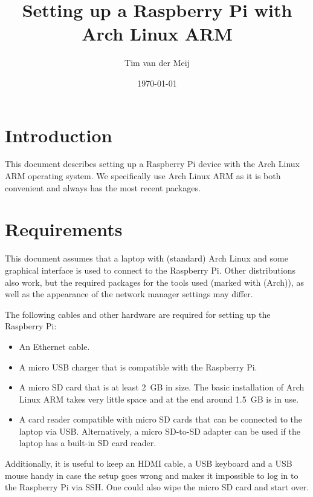 \documentclass{article}
\newcommand{\arch}{{\color{red} (Arch)}}
\begin{document}
\title{Setting up a Raspberry Pi with Arch Linux ARM}
\author{Tim van der Meij}
\date{\today}

\maketitle

\section{Introduction}
This document describes setting up a Raspberry Pi device with the Arch Linux ARM
operating system. We specifically use Arch Linux ARM as it is both convenient 
and always has the most recent packages.

\section{Requirements}
This document assumes that a laptop with (standard) Arch Linux and some 
graphical interface is used to connect to the Raspberry Pi. Other distributions 
also work, but the required packages for the tools used (marked with \arch{}), 
as well as the appearance of the network manager settings may differ.

The following cables and other hardware are required for setting up the 
Raspberry Pi:

\begin{itemize}
    \item An Ethernet cable.
    \item A micro USB charger that is compatible with the Raspberry Pi.
    \item A micro SD card that is at least 2~GB in size. The basic installation 
          of Arch Linux ARM takes very little space and at the end around
          1.5~GB is in use.
    \item A card reader compatible with micro SD cards that can be connected to 
          the laptop via USB\@. Alternatively, a micro SD-to-SD adapter can be 
          used if the laptop has a built-in SD card reader.
\end{itemize}

Additionally, it is useful to keep an HDMI cable, a USB keyboard and a USB 
mouse handy in case the setup goes wrong and makes it impossible to log in to 
the Raspberry Pi via SSH\@. One could also wipe the micro SD card and start
over.
\end{document}
